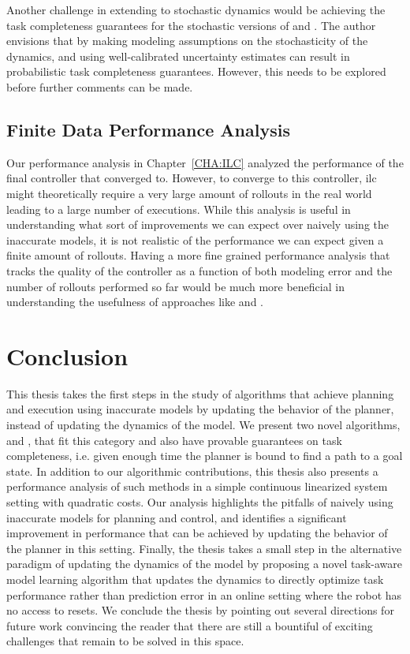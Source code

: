 Another challenge in extending to stochastic dynamics would be
achieving the task completeness guarantees for the stochastic versions
of \cmax{} and \cmaxpp{}. The author envisions that by making modeling
assumptions on the stochasticity of the dynamics, and using
well-calibrated uncertainty estimates can result in probabilistic task
completeness guarantees. However, this needs to be explored before
further comments can be made.

\subsection{Finite Data Performance Analysis}
\label{sec:finite-data-perf}

Our performance analysis in Chapter~\ref{CHA:ILC} analyzed the
performance of the final controller that \ilc{} converged to. However,
to converge to this controller, ilc{} might theoretically require a
very large amount of rollouts in the real world leading to a large
number of executions. While this analysis is useful in understanding
what sort of improvements we can expect over naively using the
inaccurate models, it is not realistic of the performance we can
expect given a finite amount of rollouts. Having a more fine grained
performance analysis that tracks the quality of the controller as a
function of both modeling error and the number of rollouts performed
so far would be much more beneficial in understanding the usefulness
of approaches like \cmax{} and \cmaxpp{}.

\section{Conclusion}
\label{sec:conclusion-1}

This thesis takes the first steps in the study of algorithms that
achieve planning and execution using inaccurate models by updating the
behavior of the planner, instead of updating the dynamics of the
model. We present two novel algorithms, \cmax{} and \cmaxpp{}, that
fit this category and also have provable guarantees on task
completeness, i.e. given enough time the planner is bound to find a
path to a goal state. In addition to our algorithmic contributions,
this thesis also presents a performance analysis of such methods in a
simple continuous linearized system setting with quadratic costs. Our
analysis highlights the pitfalls of naively using inaccurate models
for planning and control, and identifies a significant improvement in
performance that can be achieved by updating the behavior of the
planner in this setting. Finally, the thesis takes a small step in the
alternative paradigm of updating the dynamics of the model by
proposing a novel task-aware model learning algorithm \toms{} that updates the dynamics to
directly optimize task performance rather than prediction error in an
online setting where the robot has no access to resets. We conclude
the thesis by pointing out several directions for future work
convincing the reader that there are still a bountiful of exciting
challenges that remain to be solved in this space.


